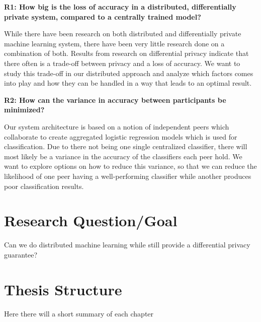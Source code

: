 \vspace{3mm}
\noindent\textbf{R1: How big is the loss of accuracy in a distributed, differentially private system, compared to a centrally trained model?}

\noindent While there have been research on both distributed and differentially private machine learning system, there have been very little research done on a combination of both. Results from research on differential privacy indicate that there often is a trade-off between privacy and a loss of accuracy. We want to study this trade-off in our distributed approach and analyze which factors comes into play and how they can be handled in a way that leads to an optimal result. 

\vspace{3mm}
\noindent
\textbf{R2: How can the variance in accuracy between participants be minimized?}

\noindent Our system architecture is based on a notion of independent peers which collaborate to create aggregated logistic regression models which is used for classification. Due to there not being one single centralized classifier, there will most likely be a variance in the accuracy of the classifiers each peer hold. We want to explore options on how to reduce this variance, so that we can reduce the likelihood of one peer having a well-performing classifier while another produces poor classification results. 



\section{Research Question/Goal}
Can we do distributed machine learning while still provide a differential privacy guarantee?


\section{Thesis Structure}
Here there will a short summary of each chapter


